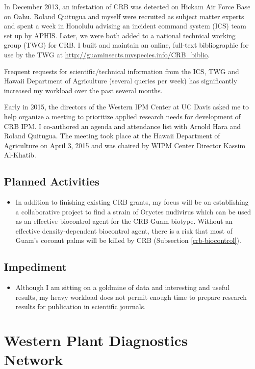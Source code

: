 \documentclass[12pt,oneside,english]{scrbook}
\begin{document}
In December 2013, an infestation of CRB was detected on Hickam Air
Force Base on Oahu. Roland Quitugua and myself were recruited as subject
matter experts and spent a week in Honolulu advising an incident command
system (ICS) team set up by APHIS. Later, we were both added to a
national technical working group (TWG) for CRB. I built and maintain
an online, full-text bibliographic for use by the TWG at \url{http://guaminsects.myspecies.info/CRB_biblio}.

Frequent requests for scientific/technical information from the ICS,
TWG and Hawaii Department of Agriculture (several queries per week)
has significantly increased my workload over the past several months.

Early in 2015, the directors of the Western IPM Center at UC Davis asked me to help organize a meeting to prioritize applied research needs for development of CRB IPM. I co-authored an agenda and attendance list with Arnold Hara and Roland Quitugua. The meeting took place at the Hawaii Department of Agriculture on April 3, 2015 and was chaired by WIPM Center Director Kassim Al-Khatib.

\subsection{Planned Activities}
\begin{itemize}
\item In addition to finishing existing CRB grants, my focus will be on establishing a collaborative project to find a strain of Oryctes nudivirus which can be used as an effective biocontrol agent for the CRB-Guam biotype. Without an effective density-dependent biocontrol agent, there is a risk that most of Guam's coconut palms will be killed by CRB (Subsection \ref{crb-biocontrol}).
\end{itemize}

\subsection{Impediment}
\begin{itemize}
\item Although I am sitting on a goldmine of data and interesting and useful results, my heavy workload does not permit enough time to prepare research
results for publication in scientific journals.
\end{itemize}

\section{Western Plant Diagnostics Network}
\end{document}

